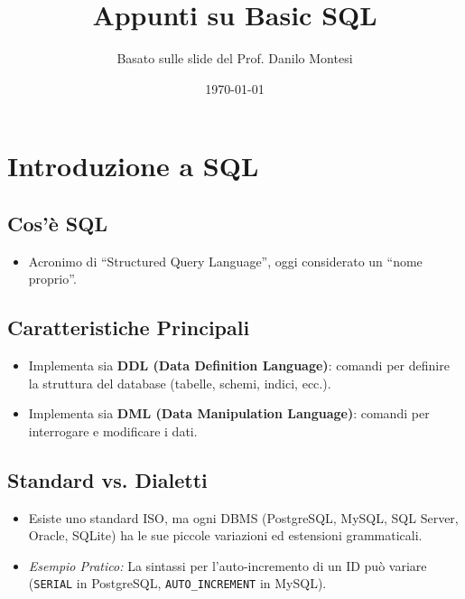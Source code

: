 \documentclass{article}
\title{Appunti su Basic SQL}
\author{Basato sulle slide del Prof. Danilo Montesi}
\date{\today}
\begin{document}
	
	\maketitle
	\tableofcontents
	\newpage
	
	\section{Introduzione a SQL}
	
	\subsection{Cos'è SQL}
	\begin{itemize}
		\item Acronimo di ``Structured Query Language'', oggi considerato un ``nome proprio''.
	\end{itemize}
	
	\subsection{Caratteristiche Principali}
	\begin{itemize}
		\item Implementa sia \textbf{DDL (Data Definition Language)}: comandi per definire la struttura del database (tabelle, schemi, indici, ecc.).
		\item Implementa sia \textbf{DML (Data Manipulation Language)}: comandi per interrogare e modificare i dati.
	\end{itemize}
	
	\subsection{Standard vs. Dialetti}
	\begin{itemize}
		\item Esiste uno standard ISO, ma ogni DBMS (PostgreSQL, MySQL, SQL Server, Oracle, SQLite) ha le sue piccole variazioni ed estensioni grammaticali.
		\item \textit{Esempio Pratico:} La sintassi per l'auto-incremento di un ID può variare (\texttt{SERIAL} in PostgreSQL, \texttt{AUTO\_INCREMENT} in MySQL).
	\end{itemize}
	
\end{document}
